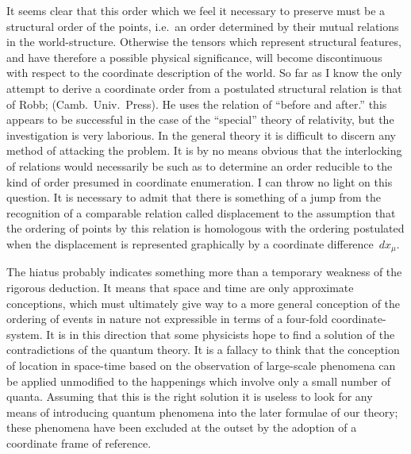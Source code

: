 \documentclass[12pt]{book}
\begin{document}
It seems clear that this order which we feel it necessary to preserve must
be a structural order of the points, i.e.\ an order determined by their mutual
relations in the world\hyp{}structure. Otherwise the tensors which represent
structural features, and have therefore a possible physical significance, will
become discontinuous with respect to the coordinate description of the world.
So far as I know the only attempt to derive a coordinate order from a postulated
structural relation is that of Robb\footnotemark;\footnotetext
  { (Camb.\ Univ.\ Press). He uses the relation of
  ``before and after.''}
this appears to be successful in the
case of the ``special'' theory of relativity, but the investigation is very
laborious. In the general theory it is difficult to discern any method of
attacking the problem. It is by no means obvious that the interlocking of
relations would necessarily be such as to determine an order reducible to the
kind of order presumed in coordinate enumeration. I can throw no light on
this question. It is necessary to admit that there is something of a jump
from the recognition of a comparable relation called displacement to the
assumption that the ordering of points by this relation is homologous with
the ordering postulated when the displacement is represented graphically by
a coordinate difference~$dx_{\mu}$.

The hiatus probably indicates something more than a temporary weakness
of the rigorous deduction. It means that space and time are only approximate
conceptions, which must ultimately give way to a more general conception of
the ordering of events in nature not expressible in terms of a four-fold coordinate\hyp{}system.
It is in this direction that some physicists hope to find a solution
of the contradictions of the quantum theory. It is a fallacy to think that the
%
conception of location in space-time based on the observation of large-scale
phenomena can be applied unmodified to the happenings which involve only
a small number of quanta. Assuming that this is the right solution it is useless
to look for any means of introducing quantum phenomena into the later
formulae of our theory; these phenomena have been excluded at the outset
by the adoption of a coordinate frame of reference.
\end{document}
